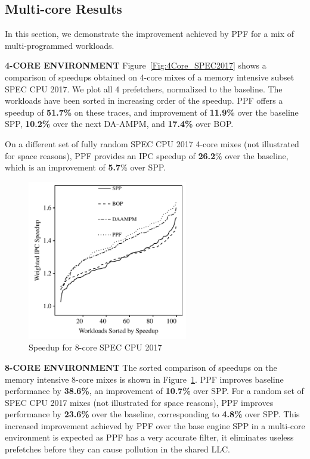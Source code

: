 \subsection{Multi-core Results}
\label{Results-Multi}
In this section, we demonstrate the improvement achieved by PPF for a mix of
multi-programmed workloads.
\newline

\noindent \textbf{4-CORE ENVIRONMENT}
\newline
Figure~\ref{Fig:4Core_SPEC2017} shows a comparison of speedups obtained on
4-core mixes of a memory intensive subset SPEC CPU 2017.  We plot all 4
prefetchers, normalized to the baseline.  The workloads have been sorted in
increasing order of the speedup.  PPF offers a speedup of \textbf{51.7\%} on
these traces, and improvement of \textbf{11.9\%} over the baseline SPP,
\textbf{10.2\%} over the next DA-AMPM, and \textbf{17.4\%} over BOP.

On a different set of fully random SPEC CPU 2017 4-core mixes (not illustrated
for space reasons), PPF provides an IPC speedup of \textbf{26.2}\% over the
baseline, which is an improvement of \textbf{5.7}\% over SPP.


\begin{figure}[ht]
\includegraphics[width=2.75in]{8CORE_IPC_PPF}
\caption{Speedup for 8-core SPEC CPU 2017}
\label{Fig:8Core_SPEC2017}
\end{figure}

\noindent \textbf{8-CORE ENVIRONMENT}
\newline
The sorted comparison of speedups on the memory intensive 8-core mixes is
shown in Figure~\ref{Fig:8Core_SPEC2017}.  PPF improves baseline performance
by \textbf{38.6\%}, an improvement of \textbf{10.7\%} over SPP.  For a random
set of SPEC CPU 2017 mixes (not illustrated for space reasons), PPF improves
performance by \textbf{23.6\%} over the baseline, corresponding to
\textbf{4.8\%} over SPP.  This increased improvement achieved by PPF over the
base engine SPP in a multi-core environment is expected as PPF has a very
accurate filter, it eliminates useless prefetches before they can cause
pollution in the shared LLC.

